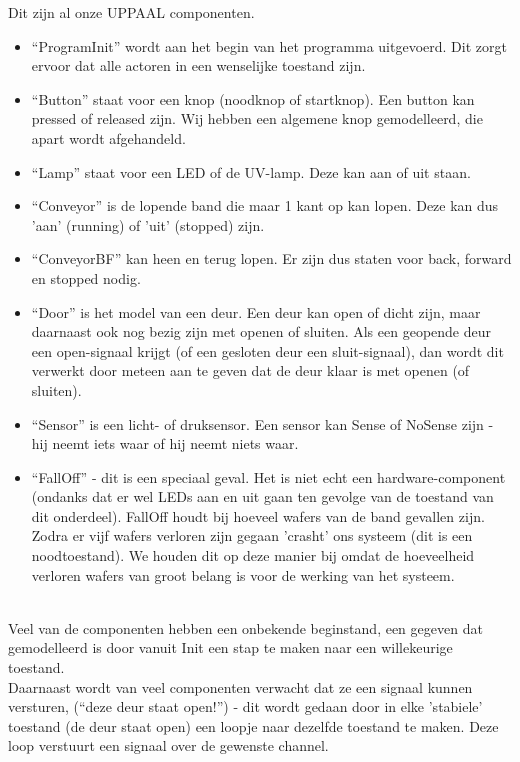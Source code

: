 Dit zijn al onze UPPAAL componenten.

\begin{itemize}
    \item ``ProgramInit'' wordt aan het begin van het programma uitgevoerd. Dit zorgt ervoor dat alle actoren in een wenselijke toestand zijn.
    \item ``Button'' staat voor een knop (noodknop of startknop). Een button kan pressed of released zijn. Wij hebben een algemene knop gemodelleerd, die apart wordt afgehandeld.
    \item ``Lamp'' staat voor een LED of de UV-lamp. Deze kan aan of uit staan.
    \item ``Conveyor'' is de lopende band die maar 1 kant op kan lopen. Deze kan dus 'aan' (running) of 'uit' (stopped) zijn.
    \item ``ConveyorBF'' kan heen en terug lopen. Er zijn dus staten voor back, forward en stopped nodig.
    \item ``Door'' is het model van een deur. Een deur kan open of dicht zijn, maar daarnaast ook nog bezig zijn met openen of sluiten. Als een geopende deur een open-signaal krijgt (of een gesloten deur een sluit-signaal), dan wordt dit verwerkt door meteen aan te geven dat de deur klaar is met openen (of sluiten).
    \item ``Sensor'' is een licht- of druksensor. Een sensor kan Sense of NoSense zijn - hij neemt iets waar of hij neemt niets waar.
    \item ``FallOff'' - dit is een speciaal geval. Het is niet echt een hardware-component (ondanks dat er wel LEDs aan en uit gaan ten gevolge van de toestand van dit onderdeel). FallOff houdt bij hoeveel wafers van de band gevallen zijn. Zodra er vijf wafers verloren zijn gegaan 'crasht' ons systeem (dit is een noodtoestand). We houden dit op deze manier bij omdat de hoeveelheid verloren wafers van groot belang is voor de werking van het systeem.
\end{itemize} \\
Veel van de componenten hebben een onbekende beginstand, een gegeven dat gemodelleerd is door vanuit Init een stap te maken naar een willekeurige toestand.\\
Daarnaast wordt van veel componenten verwacht dat ze een signaal kunnen versturen,  (``deze deur staat open!'') - dit wordt gedaan door in elke  'stabiele' toestand (de deur staat open) een loopje naar dezelfde toestand te maken. Deze loop verstuurt een signaal over de gewenste channel.
